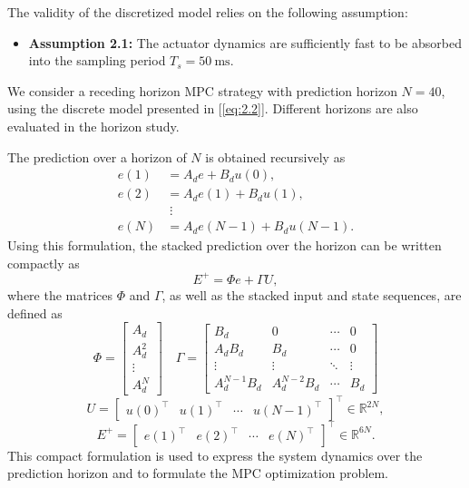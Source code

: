 \documentclass[10pt,twocolumn,twoside]{IEEEtran}
\begin{document}
The validity of the discretized model relies on the following assumption:
\begin{itemize}
    \item \textbf{Assumption 2.1:} The actuator dynamics are sufficiently fast to be absorbed into the sampling period $T_s = 50\ \mathrm{ms}$.
\end{itemize}
\vspace{\baselineskip}

We consider a receding horizon MPC strategy with prediction horizon $N = 40$, using the discrete model presented in [\ref{eq:2.2}]. Different horizons are also evaluated in the horizon study.

The prediction over a horizon of $N$ is obtained recursively as
\begin{align}
    e(1) &= A_d e + B_d u(0), \\
    e(2) &= A_d e(1) + B_d u(1), \\
         &\;\vdots \nonumber \\
    e(N) &= A_d e(N-1) + B_d u(N-1).
    \label{eq:2.4}
\end{align}
Using this formulation, the stacked prediction over the horizon can be written compactly as
\begin{equation}
    E^{+} = \Phi e + \Gamma U,
    \label{eq:2.6}
\end{equation}
where the matrices $\Phi$ and $\Gamma$, as well as the stacked input and state sequences, are defined as
\begin{equation}
    \Phi =
    \begin{bmatrix}
    A_d \\
    A_d^2 \\
    \vdots \\
    A_d^N
    \end{bmatrix} \quad
    \Gamma =
    \begin{bmatrix}
    B_d & 0 & \cdots & 0 \\
    A_d B_d & B_d & \cdots & 0 \\
    \vdots & \vdots & \ddots & \vdots \\
    A_d^{N-1} B_d & A_d^{N-2} B_d & \cdots & B_d
    \end{bmatrix}
    \label{eq:2.7}
\end{equation}
\begin{equation}
    U =
    \begin{bmatrix}
    u(0)^\top &
    u(1)^\top &
    \cdots &
    u(N-1)^\top
    \end{bmatrix}^\top \in \mathbb{R}^{2N},
    \label{eq:2.8}
\end{equation}
\begin{equation}
    E^{+} =
    \begin{bmatrix}
    e(1)^\top &
    e(2)^\top &
    \cdots &
    e(N)^\top
    \end{bmatrix}^\top \in \mathbb{R}^{6N}.
    \label{eq:2.9}
\end{equation}
This compact formulation is used to express the system dynamics over the prediction horizon and to formulate the MPC optimization problem.\\
\end{document}
